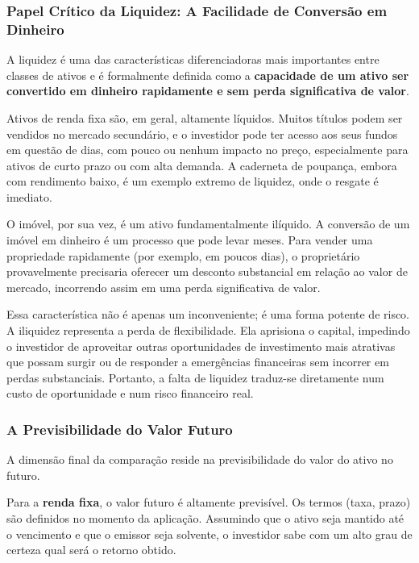\documentclass[
  a4paper,
]{book}
\begin{document}
\subsubsection{Papel Crítico da Liquidez: A Facilidade de Conversão em
Dinheiro}\label{papel-cruxedtico-da-liquidez-a-facilidade-de-conversuxe3o-em-dinheiro}

A liquidez é uma das características diferenciadoras mais importantes
entre classes de ativos e é formalmente definida como a
\textbf{capacidade de um ativo ser convertido em dinheiro rapidamente e
sem perda significativa de valor}.

Ativos de renda fixa são, em geral, altamente líquidos. Muitos títulos
podem ser vendidos no mercado secundário, e o investidor pode ter acesso
aos seus fundos em questão de dias, com pouco ou nenhum impacto no
preço, especialmente para ativos de curto prazo ou com alta demanda. A
caderneta de poupança, embora com rendimento baixo, é um exemplo extremo
de liquidez, onde o resgate é imediato.

O imóvel, por sua vez, é um ativo fundamentalmente ilíquido. A conversão
de um imóvel em dinheiro é um processo que pode levar meses. Para vender
uma propriedade rapidamente (por exemplo, em poucos dias), o
proprietário provavelmente precisaria oferecer um desconto substancial
em relação ao valor de mercado, incorrendo assim em uma perda
significativa de valor.

Essa característica não é apenas um inconveniente; é uma forma potente
de risco. A iliquidez representa a perda de flexibilidade. Ela aprisiona
o capital, impedindo o investidor de aproveitar outras oportunidades de
investimento mais atrativas que possam surgir ou de responder a
emergências financeiras sem incorrer em perdas substanciais. Portanto, a
falta de liquidez traduz-se diretamente num custo de oportunidade e num
risco financeiro real.

\subsubsection{A Previsibilidade do Valor
Futuro}\label{a-previsibilidade-do-valor-futuro}

A dimensão final da comparação reside na previsibilidade do valor do
ativo no futuro.

Para a \textbf{renda fixa}, o valor futuro é altamente previsível. Os
termos (taxa, prazo) são definidos no momento da aplicação. Assumindo
que o ativo seja mantido até o vencimento e que o emissor seja solvente,
o investidor sabe com um alto grau de certeza qual será o retorno
obtido.
\end{document}
